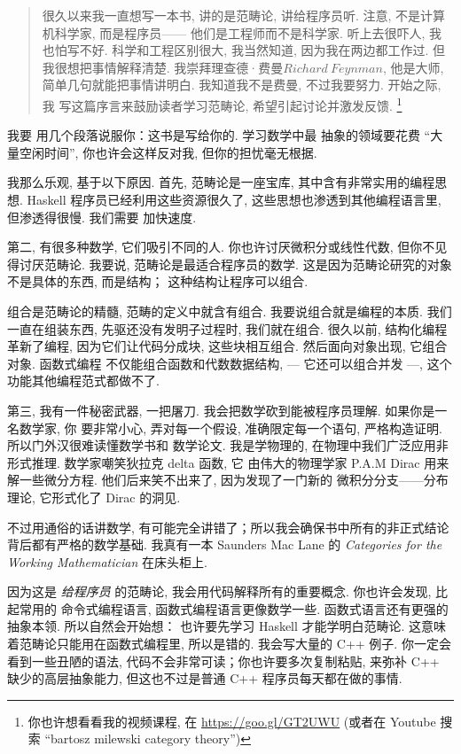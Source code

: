 
\begin{quote}
  很久以来我一直想写一本书, 讲的是范畴论, 讲给程序员听. 注意, 不是计算机科学家, 而是程序员——
  他们是工程师而不是科学家. 听上去很吓人, 我也怕写不好. 科学和工程区别很大, 我当然知道,
  因为我在两边都工作过. 但我很想把事情解释清楚. 我崇拜理查德·费曼\(Richard\ Feynman\),
  他是大师, 简单几句就能把事情讲明白. 我知道我不是费曼, 不过我要努力. 开始之际, 我
  写这篇序言来鼓励读者学习范畴论, 希望引起讨论并激发反馈. \footnote{
    你也许想看看我的视频课程, 在
    \href{https://goo.gl/GT2UWU}{https://goo.gl/GT2UWU} (或者在 Youtube 搜索
    ``bartosz milewski category theory'')}
\end{quote}

\lettrine[lhang=0.17]{我}{要} 用几个段落说服你：这书是写给你的. 学习数学中最
抽象的领域要花费 ``大量空闲时间'', 你也许会这样反对我, 但你的担忧毫无根据.

我那么乐观, 基于以下原因. 首先, 范畴论是一座宝库, 其中含有非常实用的编程思想. Haskell
程序员已经利用这些资源很久了, 这些思想也渗透到其他编程语言里, 但渗透得很慢. 我们需要
加快速度.

第二, 有很多种数学, 它们吸引不同的人. 你也许讨厌微积分或线性代数, 但你不见得讨厌范畴论.
我要说, 范畴论是最适合程序员的数学. 这是因为范畴论研究的对象不是具体的东西, 而是结构；
这种结构让程序可以组合.

组合是范畴论的精髓, 范畴的定义中就含有组合. 我要说组合就是编程的本质. 我们
一直在组装东西, 先驱还没有发明子过程时, 我们就在组合. 很久以前, 结构化编程革新了编程,
因为它们让代码分成块, 这些块相互组合. 然后面向对象出现, 它组合对象. 函数式编程
不仅能组合函数和代数数据结构, --- 它还可以组合并发 ---, 这个功能其他编程范式都做不了.

第三, 我有一件秘密武器, 一把屠刀. 我会把数学砍到能被程序员理解. 如果你是一名数学家, 你
要非常小心, 弄对每一个假设, 准确限定每一个语句, 严格构造证明. 所以门外汉很难读懂数学书和
数学论文. 我是学物理的, 在物理中我们广泛应用非形式推理. 数学家嘲笑狄拉克 delta 函数, 它
由伟大的物理学家 P.A.M Dirac 用来解一些微分方程. 他们后来笑不出来了, 因为发现了一门新的
微积分分支——分布理论, 它形式化了 Dirac 的洞见.

不过用通俗的话讲数学, 有可能完全讲错了；所以我会确保书中所有的非正式结论背后都有严格的数学基础.
我真有一本 Saunders Mac Lane 的 \emph{Categories for the Working Mathematician}
在床头柜上.

因为这是 \emph{给程序员} 的范畴论, 我会用代码解释所有的重要概念. 你也许会发现, 比起常用的
命令式编程语言, 函数式编程语言更像数学一些. 函数式语言还有更强的抽象本领. 所以自然会开始想：
也许要先学习 Haskell 才能学明白范畴论. 这意味着范畴论只能用在函数式编程里, 所以是错的.
我会写大量的 C++ 例子. 你一定会看到一些丑陋的语法, 代码不会非常可读；你也许要多次复制粘贴,
来弥补 C++ 缺少的高层抽象能力, 但这也不过是普通 C++ 程序员每天都在做的事情.

